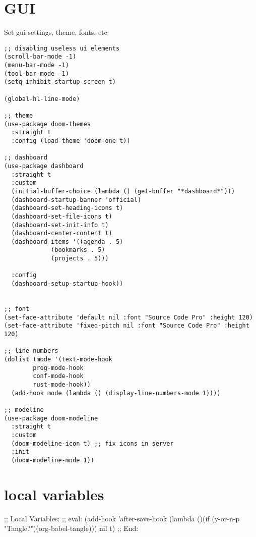 \documentclass[11pt]{article}
\begin{document}
\section{GUI}
\label{sec:org229d1bc}
Set gui settings, theme, fonts, etc
\begin{verbatim}
;; disabling useless ui elements
(scroll-bar-mode -1)
(menu-bar-mode -1)
(tool-bar-mode -1)
(setq inhibit-startup-screen t)

(global-hl-line-mode)

;; theme
(use-package doom-themes
  :straight t
  :config (load-theme 'doom-one t))

;; dashboard
(use-package dashboard
  :straight t
  :custom
  (initial-buffer-choice (lambda () (get-buffer "*dashboard*")))
  (dashboard-startup-banner 'official)
  (dashboard-set-heading-icons t)
  (dashboard-set-file-icons t)
  (dashboard-set-init-info t)
  (dashboard-center-content t)
  (dashboard-items '((agenda . 5)
		     (bookmarks . 5)
		     (projects . 5)))

  :config
  (dashboard-setup-startup-hook))


;; font
(set-face-attribute 'default nil :font "Source Code Pro" :height 120)
(set-face-attribute 'fixed-pitch nil :font "Source Code Pro" :height 120)

;; line numbers
(dolist (mode '(text-mode-hook
		prog-mode-hook
		conf-mode-hook
		rust-mode-hook))
  (add-hook mode (lambda () (display-line-numbers-mode 1))))

;; modeline
(use-package doom-modeline
  :straight t
  :custom
  (doom-modeline-icon t) ;; fix icons in server
  :init
  (doom-modeline-mode 1))
\end{verbatim}
\section{local variables}
\label{sec:orgb2f7615}
;; Local Variables: 
;; eval: (add-hook 'after-save-hook (lambda ()(if (y-or-n-p "Tangle?")(org-babel-tangle))) nil t) 
;; End:
\end{document}
